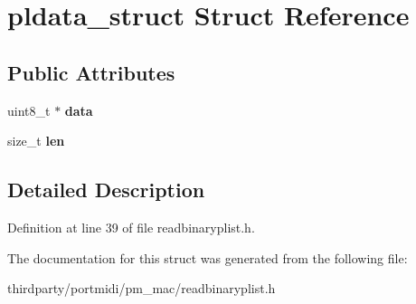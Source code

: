 \hypertarget{structpldata__struct}{}\section{pldata\+\_\+struct Struct Reference}
\label{structpldata__struct}
\subsection*{Public Attributes}
\begin{DoxyCompactItemize}
\item 
\mbox{\label{structpldata__struct_aa49e9df08964fc653b2f80080f348d90}} 
uint8\+\_\+t $\ast$ {\bfseries data}
\item 
\mbox{\label{structpldata__struct_a4ac29c88cd0fa2e309e4b75fdbeffbc5}} 
size\+\_\+t {\bfseries len}
\end{DoxyCompactItemize}


\subsection{Detailed Description}


Definition at line 39 of file readbinaryplist.\+h.



The documentation for this struct was generated from the following file\+:\begin{DoxyCompactItemize}
\item 
thirdparty/portmidi/pm\+\_\+mac/readbinaryplist.\+h\end{DoxyCompactItemize}
